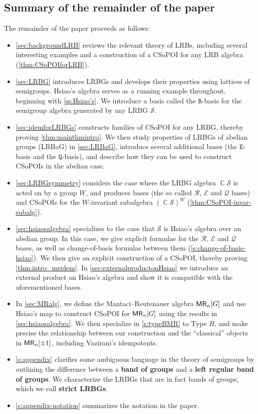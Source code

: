 \documentclass[11pt, oneside, reqno]{amsart}
\theoremstyle{definition}
\numberwithin{equation}{section}
\DeclareMathOperator{\C}{\mathbb{C}}
\newcommand{\defn}[1]{{\color{RoyalBlue}\bf#1}}
\def \MR {{\sf{MR}}}
\def \SS{{\mathcal{S}}}
\def \kk{\C}
\newcommand{\B}[1]{\mathtt{#1}} 			%
\newcommand{\SB}[1]{\mathcal{#1}} 		%
\begin{document}
\subsection*{Summary of the remainder of the paper}
The remainder of the paper proceeds as follows:
\begin{itemize}
    \item  \cref{sec:backgroundLRB} reviews the relevant theory of LRBs, including several interesting examples and a construction of a CSoPOI for any LRB algebra (\cref{thm:CSoPOIforLRB}).
    \item   \cref{sec:LRBG} introduces LRBGs and develops their properties using lattices of semigroups. Hsiao's algebra serves as a running example throughout, beginning with \cref{ss:Hsiao's}. We introduce a basis called the $\B{R}$-basis for the semigroup algebra generated by any LRBG $\SS$.
     \item  \cref{sec:idemforLRBGs} constructs families of CSoPOI for any LRBG, thereby proving \cref{thm:mainthmintro}. We then study properties of LRBGs of abelian groups (LRBaG) in \cref{sec:LRBaG}, introduce several additional bases (the $\B{E}$-basis and the $\B{Q}$-basis), and describe how they can be used to construct CSoPOIs in the abelian case. 
     \item \cref{sec:LRBGsymmetry} considers the case where the LRBG algebra $\kk \SS$ is acted on by a group $W$, and produces bases (the so called $\SB{R}$, $\SB{E}$ and $\SB{Q}$ bases) and CSoPOIs for the $W$-invariant subalgebra $(\kk \SS)^W$ (\cref{thm:CSoPOI-invar-subalg}).
     \item  \cref{sec:hsiaosalgebra} specializes to the case that $\SS$ is Hsiao's algebra over an abelian group. In this case, we give explicit formulae for the $\SB{R}$, $\SB{E}$ and $\SB{Q}$ bases, as well as change-of-basis formulas between them (\cref{s:change-of-basis-hsiao}). We then give an explicit construction of a CSoPOI, thereby proving \cref{thm:intro_mridem}.
 In \cref{sec:externalproductonHsiao} we introduce an external product on Hsiao's algebra and show it is compatible with the aforementioned bases.
 \item In \cref{sec:MRalg}, we define the Mantaci--Reutenauer algebra $\MR_n[G]$ and use Hsiao's map to construct CSoPOI for $\MR_n[G]$ using the results in \cref{sec:hsiaosalgebra}. We then specialize in \cref{s:typeBMR} to Type $B$, and make precise the relationship between our construction and the ``classical'' objects in $\MR_n[\pm 1]$, including Vazirani's idempotents. 

    \item  \cref{s:appendix} clarifies some ambiguous language in the theory of semigroups by outlining the difference between a \defn{band of groups} and a \defn{left regular band of groups}. We characterize the LRBGs that are in fact bands of groups, which we call \defn{strict LRBGs}.

\item \cref{s:appendix-notation} summarizes the notation in the paper. 
\end{itemize}
\end{document}
